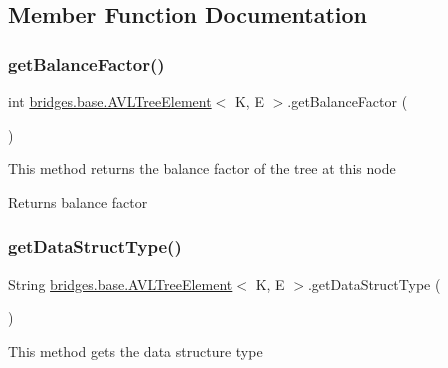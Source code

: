 \subsection{Member Function Documentation}
\mbox{\label{classbridges_1_1base_1_1_a_v_l_tree_element_a0478ca0351cd714e8f7b8e49703990c8}} 
\subsubsection{\texorpdfstring{get\+Balance\+Factor()}{getBalanceFactor()}}
{\footnotesize\ttfamily int \hyperlink{classbridges_1_1base_1_1_a_v_l_tree_element}{bridges.\+base.\+A\+V\+L\+Tree\+Element}$<$ K, E $>$.get\+Balance\+Factor (\begin{DoxyParamCaption}{ }\end{DoxyParamCaption})}

This method returns the balance factor of the tree at this node

\begin{DoxyReturn}{Returns}
balance factor 
\end{DoxyReturn}
\mbox{\label{classbridges_1_1base_1_1_a_v_l_tree_element_abdd9e63de10732ef46bd5d531bd7f9d8}} 
\subsubsection{\texorpdfstring{get\+Data\+Struct\+Type()}{getDataStructType()}}
{\footnotesize\ttfamily String \hyperlink{classbridges_1_1base_1_1_a_v_l_tree_element}{bridges.\+base.\+A\+V\+L\+Tree\+Element}$<$ K, E $>$.get\+Data\+Struct\+Type (\begin{DoxyParamCaption}{ }\end{DoxyParamCaption})}

This method gets the data structure type

